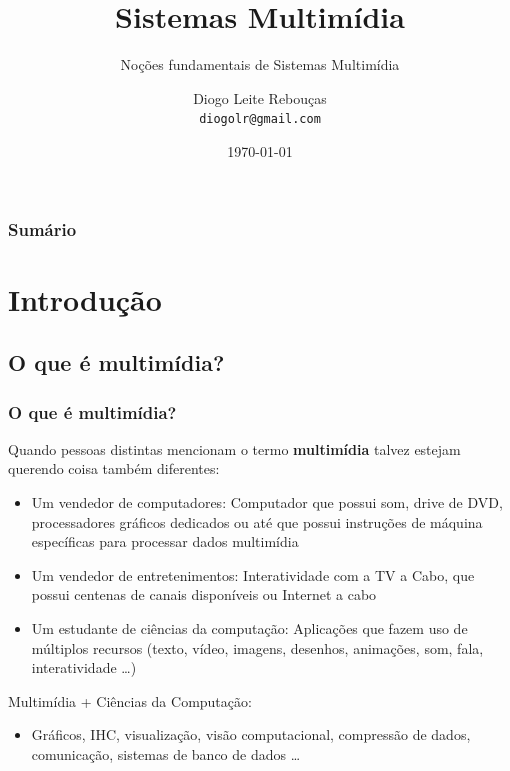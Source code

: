 \documentclass[xcolor]{beamer}
\title[Sistemas Multimídia]
{
    Sistemas Multimídia
}
\subtitle{Noções fundamentais de Sistemas Multimídia}
\author[Diogo Leite Rebouças]
{
    Diogo Leite Rebouças\\
    {\tt diogolr@gmail.com}
}
\institute
{
    Universidade do Estado do Rio Grande do Norte\\
    Departamento de Informática
}
\date{\today}
\begin{document}
\maketitle


\begin{frame}
    \frametitle{Sumário}
    \tableofcontents
\end{frame}

\section{Introdução}
\subsection{O que é multimídia?}
\begin{frame}
    \frametitle{O que é multimídia?}
    
    Quando pessoas distintas mencionam o termo {\bf multimídia} talvez
    estejam querendo coisa também diferentes:

    \begin{itemize}
        \item Um \alert{vendedor de computadores}: Computador que possui som,
drive de DVD, processadores gráficos dedicados ou até que possui instruções de
máquina específicas para processar dados multimídia
        \item Um \alert{vendedor de entretenimentos}: Interatividade com a TV a
Cabo, que possui centenas de canais disponíveis ou Internet a cabo
        \item Um \alert{estudante de ciências da computação}: Aplicações que
fazem uso de múltiplos recursos (texto, vídeo, imagens, desenhos, animações,
som, fala, interatividade \ldots )
    \end{itemize}

    Multimídia + Ciências da Computação:

    \begin{itemize}
        \item Gráficos, IHC, visualização, visão computacional, compressão de
dados, comunicação, sistemas de banco de dados \ldots
    \end{itemize}

\end{frame}
\end{document}
